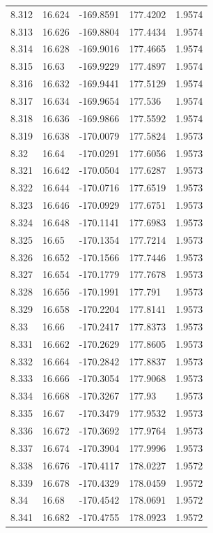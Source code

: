 \begin{tabular}{lllll}
8.312 & 16.624 & -169.8591 & 177.4202 & 1.9574 \\
8.313 & 16.626 & -169.8804 & 177.4434 & 1.9574 \\
8.314 & 16.628 & -169.9016 & 177.4665 & 1.9574 \\
8.315 & 16.63 & -169.9229 & 177.4897 & 1.9574 \\
8.316 & 16.632 & -169.9441 & 177.5129 & 1.9574 \\
8.317 & 16.634 & -169.9654 & 177.536 & 1.9574 \\
8.318 & 16.636 & -169.9866 & 177.5592 & 1.9574 \\
8.319 & 16.638 & -170.0079 & 177.5824 & 1.9573 \\
8.32 & 16.64 & -170.0291 & 177.6056 & 1.9573 \\
8.321 & 16.642 & -170.0504 & 177.6287 & 1.9573 \\
8.322 & 16.644 & -170.0716 & 177.6519 & 1.9573 \\
8.323 & 16.646 & -170.0929 & 177.6751 & 1.9573 \\
8.324 & 16.648 & -170.1141 & 177.6983 & 1.9573 \\
8.325 & 16.65 & -170.1354 & 177.7214 & 1.9573 \\
8.326 & 16.652 & -170.1566 & 177.7446 & 1.9573 \\
8.327 & 16.654 & -170.1779 & 177.7678 & 1.9573 \\
8.328 & 16.656 & -170.1991 & 177.791 & 1.9573 \\
8.329 & 16.658 & -170.2204 & 177.8141 & 1.9573 \\
8.33 & 16.66 & -170.2417 & 177.8373 & 1.9573 \\
8.331 & 16.662 & -170.2629 & 177.8605 & 1.9573 \\
8.332 & 16.664 & -170.2842 & 177.8837 & 1.9573 \\
8.333 & 16.666 & -170.3054 & 177.9068 & 1.9573 \\
8.334 & 16.668 & -170.3267 & 177.93 & 1.9573 \\
8.335 & 16.67 & -170.3479 & 177.9532 & 1.9573 \\
8.336 & 16.672 & -170.3692 & 177.9764 & 1.9573 \\
8.337 & 16.674 & -170.3904 & 177.9996 & 1.9573 \\
8.338 & 16.676 & -170.4117 & 178.0227 & 1.9572 \\
8.339 & 16.678 & -170.4329 & 178.0459 & 1.9572 \\
8.34 & 16.68 & -170.4542 & 178.0691 & 1.9572 \\
8.341 & 16.682 & -170.4755 & 178.0923 & 1.9572 \\

\end{tabular}
